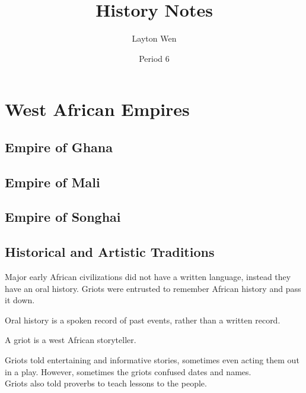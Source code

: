 \documentclass{article}
\title{History Notes}
\author{Layton Wen}
\date{Period 6}
\begin{document}
\maketitle
\toc
\clearpage
\setcounter{section}{5}
\section{West African Empires}
\subsection{Empire of Ghana}
\subsection{Empire of Mali}
\subsection{Empire of Songhai}
\subsection{Historical and Artistic Traditions}
Major early African civilizations did not have a written language, instead they have an oral history. Griots were entrusted to remember African history and pass it down.
\begin{definition}
Oral history is a spoken record of past events, rather than a written record.
\end{definition}
\begin{definition}[Griots]
A griot is a west African storyteller.
\end{definition}
Griots told entertaining and informative stories, sometimes even acting them out in a play. However, sometimes the griots confused dates and names. \\[5pt]
Griots also told proverbs to teach lessons to the people.
\end{document}

